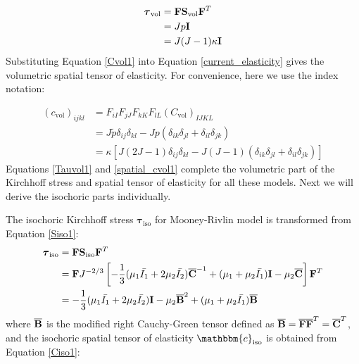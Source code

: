\begin{appendices}
\begin{subequations}
\label{Tauvol1}
\begin{align}
\boldsymbol{\tau}_\mathrm{vol} &= \bold{F}\bold{S}_\mathrm{vol}{\bold{F}}^T \\
				    &= Jp\bold{I} \label{Tauvol11}\\
		      		    &= J(J-1)\kappa \bold{I} \label{Tauvol12}
\end{align}
\end{subequations}
Substituting Equation \ref{Cvol1} into Equation \ref{current_elasticity} gives the volumetric spatial tensor of elasticity. For convenience, here we use the index notation:

\begin{subequations} \label{spatial_cvol1}
\begin{align}
(c_\mathrm{vol})_{ijkl} &= F_{iI}F_{jJ}F_{kK}F_{lL}(C_\mathrm{vol})_{IJKL} \\
&= J\tilde{p}\delta_{ij}\delta_{kl} - Jp(\delta_{ik}\delta_{jl} + \delta_{il}\delta_{jk}) \label{spatial_cvol11} \\
&= \kappa[J(2J-1)\delta_{ij}\delta_{kl} - J(J-1)(\delta_{ik}\delta_{jl} + \delta_{il}\delta_{jk})] \label{spatial_cvol12}
\end{align}
\end{subequations} 
Equations \ref{Tauvol1} and \ref{spatial_cvol1} complete the volumetric part of the Kirchhoff stress and spatial tensor of elasticity for all these models. Next we will derive the isochoric parts individually.

The isochoric Kirchhoff stress $\boldsymbol{\tau}_\mathrm{iso}$ for Mooney-Rivlin model is transformed from Equation \ref{Siso1}:
\begin{equation} \label{Tauiso1}
\begin{split}
\boldsymbol{\tau}_\mathrm{iso} &= \bold{F}\bold{S}_\mathrm{iso}{\bold{F}}^T \\
	   			    &= \bold{F}  J^{-2/3} \left[    - \frac{1}{3}(\mu_1\bar{I_1} + 2\mu_2\bar{I_2}) \overline{\bold{C}}^{-1}  + (\mu_1 + \mu_2\bar{I_1})\bold{I} - \mu_2\overline{\bold{C}} \right]   \bold{F}^T 
\\
				    &= - \frac{1}{3}(\mu_1\bar{I_1} + 2\mu_2\bar{I_2})\bold{I} - \mu_2{\overline{\bold{B}}}^2 + (\mu_1 + \mu_2\bar{I_1}){\overline{\bold{B}}}
\end{split}
\end{equation}
where $\overline{\bold{B}}$ is the modified right Cauchy-Green tensor defined as $\overline{\bold{B}} = \overline{\bold{F}}\overline{\bold{F}}^T = \overline{\bold{C}}^T$, and the isochoric spatial tensor of elasticity $\mathbbm{c}_\mathrm{iso}$ is obtained from Equation \ref{Ciso1}:


\end{appendices}
